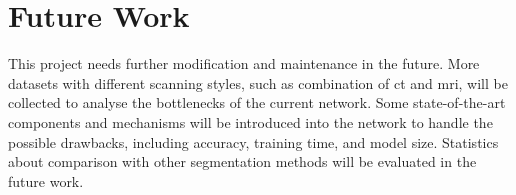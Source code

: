 \documentclass[11pt,times,oneside,openright]{eeereport}
\begin{document}
\section{Future Work}
This project needs further modification and maintenance in the future. More datasets with different scanning styles, such as combination of \acrshort{ct} and \acrshort{mri}, will be collected to analyse the bottlenecks of the current network. Some state-of-the-art components and mechanisms will be introduced into the network to handle the possible drawbacks, including accuracy, training time, and model size. Statistics about comparison with other segmentation methods will be evaluated in the future work.



\end{document}
